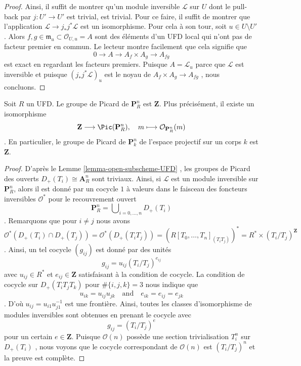 \begin{proof}
\medskip\noindent
Ainsi, il suffit de montrer qu'un module inversible  $\mathcal{L}$  sur  $U$ 
dont le pull-back par  $j : U' \to U'$  est trivial, est trivial. Pour ce faire, il
suffit de montrer que l'application  $\mathcal{L} \to j_*j^*\mathcal{L}$  est un isomorphisme. Pour cela à
son tour, soit  $u \in U \setminus U'$. Alors  $f, g \in \mathfrak m_u \subset \mathcal{O}_{U, u} = A$  sont des éléments d'un UFD local
qui n'ont pas de facteur premier en commun. Le lecteur montre facilement que cela
signifie que
$$
0 \to A \to A_f \times A_g \to A_{fg}
$$
est exact en regardant les facteurs premiers. Puisque  $A = \mathcal{L}_u$  parce que
 $\mathcal{L}$  est inversible et puisque  $(j_*j^*\mathcal{L})_u$  est le noyau de  $A_f \times A_g \to A_{fg}$ ,
nous concluons.
\end{proof}

\begin{lemma}
\label{lemma-Pic-projective-space-UFD}
Soit  $R$  un UFD. Le groupe de Picard de  $\mathbf{P}^n_R$  est  $\mathbf{Z}$.
Plus précisément, il existe un isomorphisme
$$
\mathbf{Z} \longrightarrow \Pic(\mathbf{P}^n_R),\quad
m \longmapsto \mathcal{O}_{\mathbf{P}^n_R}(m)
$$
. En particulier, le groupe de Picard de  $\mathbf{P}^n_k$  de l'espace projectif sur un
corps  $k$  est  $\mathbf{Z}$.
\end{lemma}

\begin{proof}
D'après le Lemme  \ref{lemma-open-subscheme-UFD} , les groupes de Picard des ouverts  $D_+(T_i) \cong \mathbf{A}^n_R$  sont
triviaux. Ainsi, si  $\mathcal{L}$  est un module inversible sur  $\mathbf{P}^n_R$, alors
il est donné par un cocycle  $1$ à valeurs dans le faisceau des foncteurs
inversibles  $\mathcal{O}^*$  pour le recouvrement ouvert
$$
\mathbf{P}^n_R = \bigcup\nolimits_{i = 0, \ldots, n} D_+(T_i)
$$
. Remarquons que pour  $i \not = j$  nous avons
$$
\mathcal{O}^*(D_+(T_i) \cap D_+(T_j)) =
\mathcal{O}^*(D_+(T_iT_j)) = \left(R[T_0, \ldots, T_n]_{(T_iT_j)}\right)^* =
R^* \times (T_i/T_j)^\mathbf{Z}
$$
. Ainsi, un tel cocycle  $(g_{ij})$  est donné par des unités
$$
g_{ij} = u_{ij} (T_i/T_j)^{e_{ij}}
$$
avec  $u_{ij} \in R^*$  et  $e_{ij} \in \mathbf{Z}$  satisfaisant à la condition de cocycle. La
condition de cocycle sur  $D_+(T_iT_jT_k)$  pour  $\#\{i, j, k\} = 3$  nous indique que
$$
u_{ik} = u_{ij} u_{jk} \quad\text{and}\quad
e_{ik} = e_{ij} = e_{jk}
$$
. D'où  $u_{ij} = u_{i1} u_{j1}^{-1}$  est une frontière. Ainsi, toutes les classes d'isomorphisme de
modules inversibles sont obtenues en prenant le cocycle avec
$$
g_{ij} = (T_i/T_j)^e
$$
pour un certain  $e \in \mathbf{Z}$. Puisque  $\mathcal{O}(n)$  possède une section
trivialisation  $T_i^n$  sur  $D_+(T_i)$ , nous voyons que le cocycle
correspondant de  $\mathcal{O}(n)$  est  $(T_i/T_j)^n$  et la preuve est complète.
\end{proof}






